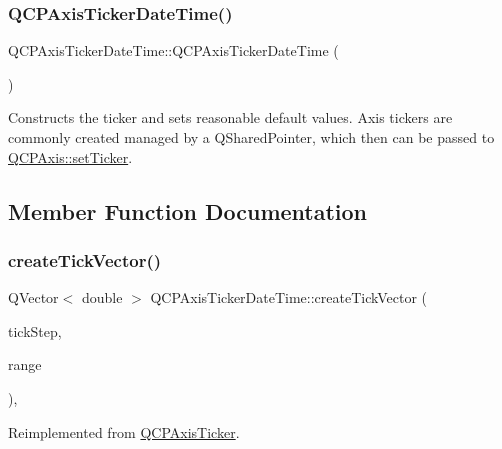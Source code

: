 \subsubsection{\texorpdfstring{Q\+C\+P\+Axis\+Ticker\+Date\+Time()}{QCPAxisTickerDateTime()}}
{\footnotesize\ttfamily Q\+C\+P\+Axis\+Ticker\+Date\+Time\+::\+Q\+C\+P\+Axis\+Ticker\+Date\+Time (\begin{DoxyParamCaption}{ }\end{DoxyParamCaption})}

Constructs the ticker and sets reasonable default values. Axis tickers are commonly created managed by a Q\+Shared\+Pointer, which then can be passed to \hyperlink{class_q_c_p_axis_a4ee03fcd2c74d05cd1a419b9af5cfbdc}{Q\+C\+P\+Axis\+::set\+Ticker}. 

\subsection{Member Function Documentation}
\mbox{\label{class_q_c_p_axis_ticker_date_time_a44c2c09a303d281801b69226e243047d}} 
\subsubsection{\texorpdfstring{create\+Tick\+Vector()}{createTickVector()}}
{\footnotesize\ttfamily Q\+Vector$<$ double $>$ Q\+C\+P\+Axis\+Ticker\+Date\+Time\+::create\+Tick\+Vector (\begin{DoxyParamCaption}\item[{double}]{tick\+Step,  }\item[{const \hyperlink{class_q_c_p_range}{Q\+C\+P\+Range} \&}]{range }\end{DoxyParamCaption})\hspace{0.3cm}{\ttfamily [protected]}, {\ttfamily [virtual]}}



Reimplemented from \hyperlink{class_q_c_p_axis_ticker_af4645a824c7bd2ca8fc7e86ebf9055bd}{Q\+C\+P\+Axis\+Ticker}.

\mbox{\label{class_q_c_p_axis_ticker_date_time_aac8e2bb32ca8ff1394c42d2d62390718}} 
